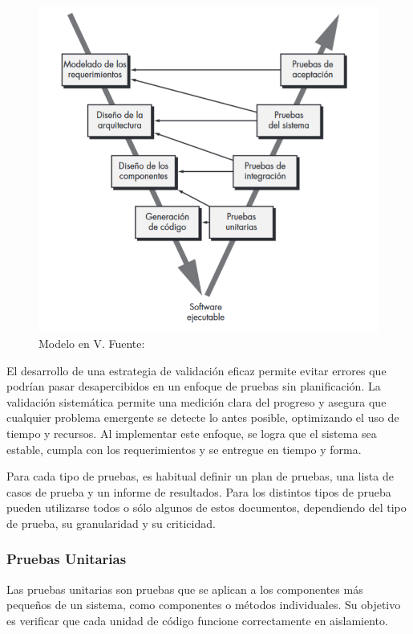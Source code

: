 \documentclass[main.tex]{subfiles}
\begin{document}
\begin{figure}[h]
	\centering
	\includegraphics[width=\linewidth]{../assets/model-v.png}
	\caption{Modelo en V. Fuente: \cite{pressman2010ingeneria}}
\end{figure}

El desarrollo de una estrategia de validación eficaz permite evitar errores que podrían pasar desapercibidos en un enfoque de pruebas sin planificación. La validación sistemática permite una medición clara del progreso y asegura que cualquier problema emergente se detecte lo antes posible, optimizando el uso de tiempo y recursos. Al implementar este enfoque, se logra que el sistema sea estable, cumpla con los requerimientos y se entregue en tiempo y forma.

Para cada tipo de pruebas, es habitual definir un plan de pruebas, una lista de casos de prueba y un informe de resultados. Para los distintos tipos de prueba pueden utilizarse todos o sólo algunos de estos documentos, dependiendo del tipo de prueba, su granularidad y su criticidad.

\subsubsection{Pruebas Unitarias}

Las pruebas unitarias son pruebas que se aplican a los componentes más pequeños de un sistema, como componentes o métodos individuales. Su objetivo es verificar que cada unidad de código funcione correctamente en aislamiento.
\end{document}
